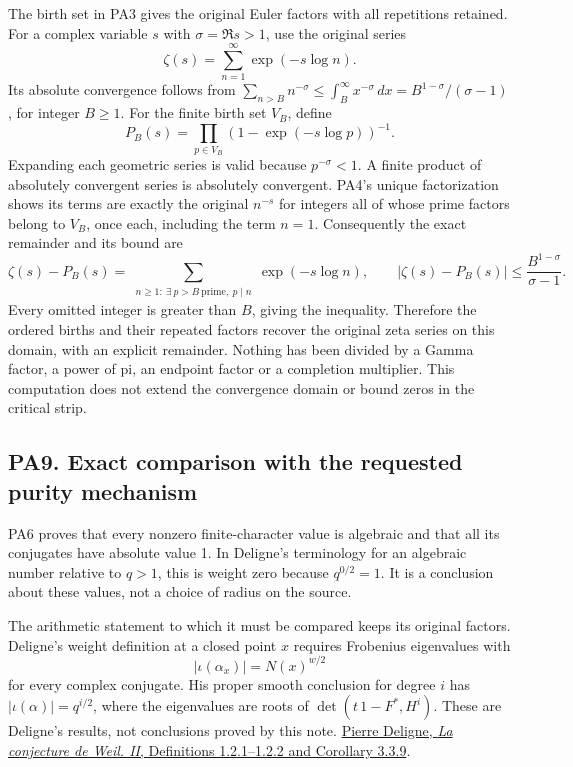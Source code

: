 The birth set in PA3 gives the original Euler factors with all repetitions retained. For a complex variable \(s\) with \(\sigma=\Re s>1\), use the original series \[
\zeta(s)=\sum_{n=1}^{\infty}\exp(-s\log n).
\] Its absolute convergence follows from \(\sum_{n>B}n^{-\sigma}\le\int_B^\infty x^{-\sigma}\,dx
=B^{1-\sigma}/(\sigma-1)\), for integer \(B\ge1\). For the finite birth set \(V_B\), define \[
P_B(s)=\prod_{p\in V_B}\left(1-\exp(-s\log p)\right)^{-1}.
\] Expanding each geometric series is valid because \(p^{-\sigma}<1\). A finite product of absolutely convergent series is absolutely convergent. PA4's unique factorization shows its terms are exactly the original \(n^{-s}\) for integers all of whose prime factors belong to \(V_B\), once each, including the term \(n=1\). Consequently the exact remainder and its bound are \[
\zeta(s)-P_B(s)
=\sum_{\substack{n\ge1:\ \exists\ p>B\ \mathrm{prime},\ p\mid n}}\exp(-s\log n),
\qquad
|\zeta(s)-P_B(s)|\le\frac{B^{1-\sigma}}{\sigma-1}.
\tag{PA8.1}
\] Every omitted integer is greater than \(B\), giving the inequality. Therefore the ordered births and their repeated factors recover the original zeta series on this domain, with an explicit remainder. Nothing has been divided by a Gamma factor, a power of pi, an endpoint factor or a completion multiplier. This computation does not extend the convergence domain or bound zeros in the critical strip.

\subsection{PA9. Exact comparison with the requested purity mechanism}\label{pa20260924-pa9.-exact-comparison-with-the-requested-purity-mechanism}

PA6 proves that every nonzero finite-character value is algebraic and that all its conjugates have absolute value 1. In Deligne's terminology for an algebraic number relative to \(q>1\), this is weight zero because \(q^{0/2}=1\). It is a conclusion about these values, not a choice of radius on the source.

The arithmetic statement to which it must be compared keeps its original factors. Deligne's weight definition at a closed point \(x\) requires Frobenius eigenvalues with \[
|\iota(\alpha_x)|=N(x)^{w/2}
\] for every complex conjugate. His proper smooth conclusion for degree \(i\) has \(|\iota(\alpha)|=q^{i/2}\), where the eigenvalues are roots of \(\det(t\,1-F^*,H^i)\). These are Deligne's results, not conclusions proved by this note. \href{https://www.numdam.org/item/PMIHES_1980__52__137_0/}{Pierre Deligne, \emph{La conjecture de Weil. II}, Definitions 1.2.1--1.2.2 and Corollary 3.3.9}.

